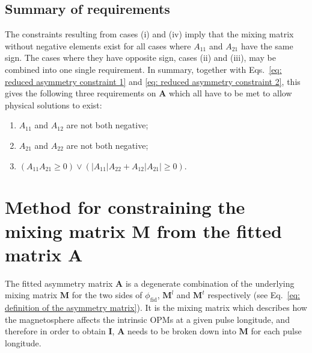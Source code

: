 \subsection*{Summary of requirements}
The constraints resulting from cases (i) and (iv) imply that the mixing matrix without negative elements exist for all cases where $A_{11}$ and $A_{21}$ have the same sign. The cases where they have opposite sign, cases (ii) and (iii), may be combined into one single requirement. In summary, together with Eqs.~\eqref{eq: reduced asymmetry constraint 1} and \eqref{eq: reduced asymmetry constraint 2}, this gives the following three requirements on $\mathbf{A}$ which all have to be met to allow physical solutions to exist:
\begin{enumerate}
    \item $A_{11}$ and $A_{12}$ are not both negative;
    \item $A_{21}$ and $A_{22}$ are not both negative;
    \item $(A_{11}A_{21} \geq 0) \lor (|A_{11}|A_{22} + A_{12}|A_{21}| \geq 0)$.
\end{enumerate}
 

















\section{Method for constraining the mixing matrix \texorpdfstring{$\mathbf{M}$}{\textbf{M}} from the fitted matrix \texorpdfstring{$\mathbf{A}$}{\textbf{A}}}
\label{app: matrix maths - posmatrix explanation}

The fitted asymmetry matrix $\mathbf{A}$ is a degenerate combination of the underlying mixing matrix $\mathbf{M}$ for the two sides of $\phi_\mathrm{fid}$, $\mathbf{M}^l$ and $\mathbf{M}^t$ respectively (see Eq.~\eqref{eq: definition of the asymmetry matrix}). It is the mixing matrix which describes how the magnetosphere affects the intrinsic OPMs at a given pulse longitude, and therefore in order to obtain $\mathbf{I}$, $\mathbf{A}$ needs to be broken down into $\mathbf{M}$ for each pulse longitude.

